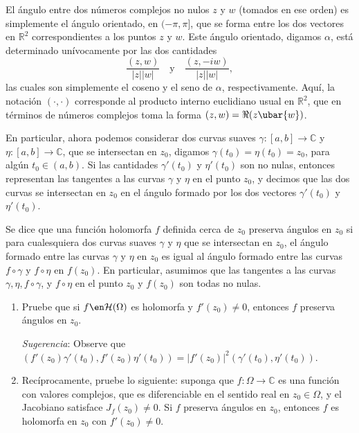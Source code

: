 \setcounter{pro}{1}
\begin{prob}
El ángulo entre dos números complejos no nulos $z$ y $w$ (tomados en ese orden) es simplemente el ángulo orientado, en $(-\pi, \pi]$, que se forma entre los dos vectores en $\mathbb{R}^2$ correspondientes a los puntos $z$ y $w$. Este ángulo orientado, digamos $\alpha$, está determinado unívocamente por las dos cantidades
\[ \frac{(z,w)}{|z||w|} \quad \text{y} \quad \frac{(z,-iw)}{|z||w|}, \]
las cuales son simplemente el coseno y el seno de $\alpha$, respectivamente. Aquí, la notación $(\cdot, \cdot)$ corresponde al producto interno euclidiano usual en $\mathbb{R}^2$, que en términos de números complejos toma la forma $(z,w) = \Re(z\ubar{w})$.

En particular, ahora podemos considerar dos curvas suaves $\gamma\colon [a,b] \to \mathbb{C}$ y $\eta\colon [a,b] \to \mathbb{C}$, que se intersectan en $z_0$, digamos $\gamma(t_0) = \eta(t_0) = z_0$, para algún $t_0 \in (a,b)$. Si las cantidades $\gamma'(t_0)$ y $\eta'(t_0)$ son no nulas, entonces representan las tangentes a las curvas $\gamma$ y $\eta$ en el punto $z_0$, y decimos que las dos curvas se intersectan en $z_0$ en el ángulo formado por los dos vectores $\gamma'(t_0)$ y $\eta'(t_0)$.

Se dice que una función holomorfa $f$ definida cerca de $z_0$ preserva ángulos en $z_0$ si para cualesquiera dos curvas suaves $\gamma$ y $\eta$ que se intersectan en $z_0$, el ángulo formado entre las curvas $\gamma$ y $\eta$ en $z_0$ es igual al ángulo formado entre las curvas $f \circ \gamma$ y $f \circ \eta$ en $f(z_0)$. En particular, asumimos que las tangentes a las curvas $\gamma, \eta, f \circ \gamma$, y $f \circ \eta$ en el punto $z_0$ y $f(z_0)$ son todas no nulas.
\begin{enumerate}[label=(\alph*),leftmargin=1.5em]
    \item Pruebe que si $f\en \mathcal{H}(\Omega)$ es holomorfa y $f'(z_0) \neq 0$, entonces $f$ preserva ángulos en $z_0$. \par
    \emph{Sugerencia}: Observe que $(f'(z_0)\gamma'(t_0), f'(z_0)\eta'(t_0)) = |f'(z_0)|^2(\gamma'(t_0), \eta'(t_0))$.
    \item Recíprocamente, pruebe lo siguiente: suponga que $f\colon \Omega \to \mathbb{C}$ es una función con valores complejos, que es diferenciable en el sentido real en $z_0 \in \Omega$, y el Jacobiano satisface $J_f(z_0) \neq 0$. Si $f$ preserva ángulos en $z_0$, entonces $f$ es holomorfa en $z_0$ con $f'(z_0) \neq 0$.
\end{enumerate}
\end{prob}
